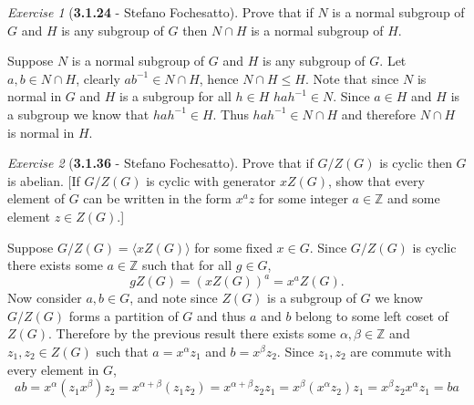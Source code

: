 \documentclass[12pt]{amsart}
\makeatletter
\theoremstyle{remark}
\newtheorem*{exercise}{Exercise}%
\def\ZZ{\ensuremath{\mathbb Z}}
\renewenvironment{proof}[1][\proofname]{\par\doublespacing
  \pushQED{\qed}%
  \normalfont \topsep6\p@\@plus6\p@\relax
  \list{}{%
    \settowidth{\leftmargin}{\itshape\proofname:\hskip\labelsep}%
    \setlength{\labelwidth}{0pt}%
    \setlength{\itemindent}{-\leftmargin}%
  }%
  \item[\hskip\labelsep\itshape#1\@addpunct{:}]\ignorespaces
}{%
  \popQED\endlist\@endpefalse
  \singlespacing
}
\theoremstyle{mycomment}
\makeatother
\begin{document}
\begin{exercise}[\textbf{3.1.24} - Stefano Fochesatto] Prove that if $N$ is a normal subgroup of $G$ and $H$ is any subgroup of $G$ then $N\cap H$
  is a normal subgroup of $H$.
  \begin{proof} Suppose $N$ is a normal subgroup of $G$ and $H$ is any subgroup of $G$. Let $a, b \in N\cap H$, clearly 
    $ab^{-1} \in  N\cap H$, hence $N\cap H \leq H$. Note that since $N$ is normal in $G$ and $H$ is a subgroup for all $h \in H$
    $hah^{-1} \in N$. Since $a \in H$ and $H$ is a subgroup we know that $hah^{-1} \in H$. Thus $hah^{-1} \in N\cap H$ and therefore 
    $N\cap H$ is normal in $H$. 
  \end{proof}
\end{exercise}
\vspace{.15in}








\begin{exercise}[\textbf{3.1.36} - Stefano Fochesatto] Prove that if $G/Z(G)$ is cyclic then $G$ is abelian. [If $G/Z(G)$ is cyclic 
  with generator $xZ(G)$, show that every element of $G$ can be written in the form $x^az$ for some integer $a \in \ZZ$ and some element $z \in Z(G)$.]
  \begin{proof} Suppose $G/Z(G) = \langle  xZ(G)\rangle$ for some fixed $x \in G$. Since $G/Z(G)$ is cyclic there exists some $a \in \ZZ$ such that for all $g \in G$, 
    \begin{equation*}
      gZ(G) = (xZ(G))^a = x^aZ(G). 
    \end{equation*}
    Now consider $a, b \in G$, and note since $Z(G)$ is a subgroup of $G$ we know $G/Z(G)$ forms a partition of $G$ and thus 
    $a$ and $b$ belong to some left coset of $Z(G)$. Therefore by the previous result there exists some 
    $\alpha, \beta \in \ZZ$ and $z_1, z_2 \in Z(G)$ such that $a = x^{\alpha}z_1$ and $b = x^{\beta}z_2$. Since $z_1, z_2$ are commute with every element in $G$, 
    \begin{equation*}
      ab = x^{\alpha}(z_1x^{\beta})z_2 = x^{\alpha + \beta}(z_1z_2) = x^{\alpha + \beta}z_2z_1 = x^{\beta}(x^{\alpha}z_2)z_1 = x^{\beta}z_2x^{\alpha}z_1 = ba
    \end{equation*}
  \end{proof}
\end{exercise}
\vspace{.15in}








  
\end{document}
